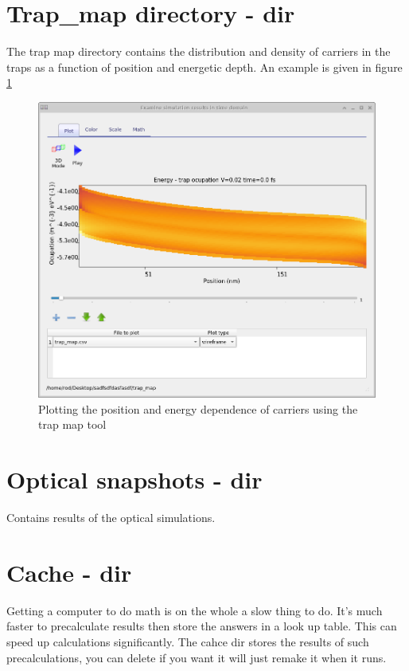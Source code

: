 \section{Trap\_map directory - dir}
The trap map directory contains the distribution and density of carriers in the traps as a function of position and energetic depth. An example is given in figure \ref{fig:trapmap}
\label{sec:trapmap}


\begin{figure}[H]
\centering
\includegraphics[width=\textwidth,height=0.7\textwidth]{./images/trapmap.png}
\caption{Plotting the position and energy dependence of carriers using the trap map tool}
\label{fig:trapmap}
\end{figure}

\section{Optical snapshots - dir}
\label{sec:snapshotsoptical}
Contains results of the optical simulations.

\section{Cache - dir}
\label{sec:cache}
Getting a computer to do math is on the whole a slow thing to do. It's much faster to precalculate results then store the answers in a look up table.  This can speed up calculations significantly.  The cahce dir stores the results of such precalculations, you can delete if you want it \simname will just remake it when it runs.

